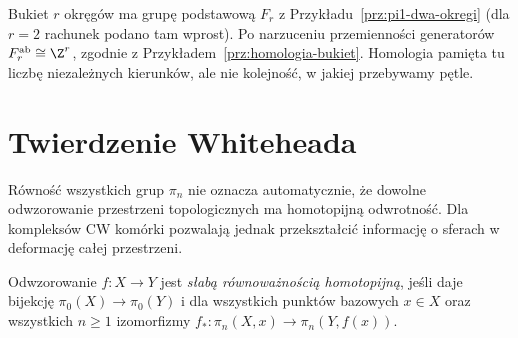 \begin{przyklad}
Bukiet $r$ okręgów ma
grupę podstawową
$F_r$ z
Przykładu~\ref{prz:pi1-dwa-okregi}
(dla $r=2$ rachunek
podano tam wprost).
Po narzuceniu
przemienności generatorów
$F_r^{\mathrm{ab}}\cong\Z^r$,
zgodnie z
Przykładem~\ref{prz:homologia-bukiet}.
Homologia pamięta tu
liczbę niezależnych
kierunków, ale nie
kolejność, w jakiej
przebywamy pętle.
\end{przyklad}

\section{Twierdzenie Whiteheada}
\label{sec:whitehead}

Równość wszystkich grup $\pi_n$
nie oznacza automatycznie, że
dowolne odwzorowanie przestrzeni
topologicznych ma homotopijną
odwrotność. Dla kompleksów CW
komórki pozwalają jednak
przekształcić informację
o sferach w deformację
całej przestrzeni.

\begin{definicja}
\label{def:slaba-rownowaznosc}
Odwzorowanie $f:X\to Y$ jest
\emph{słabą równoważnością
homotopijną}, jeśli daje
bijekcję $\pi_0(X)\to\pi_0(Y)$
i dla wszystkich punktów
bazowych $x\in X$ oraz
wszystkich $n\geq1$
izomorfizmy
$f_*:\pi_n(X,x)\to
\pi_n(Y,f(x))$.
\end{definicja}


